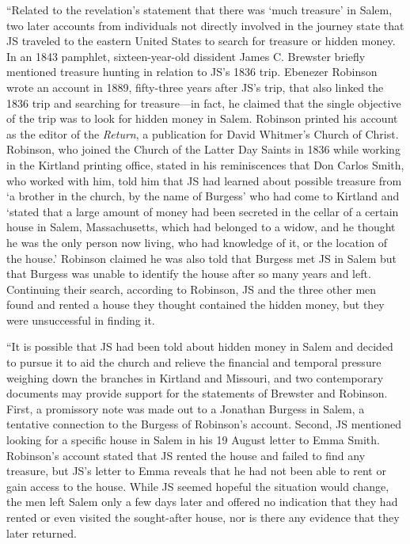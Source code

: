 			``Related to the revelation's statement that there was `much treasure' in Salem, two later accounts from individuals not directly involved in the journey state that JS traveled to the eastern United States to search for treasure or hidden money. In an 1843 pamphlet, sixteen-year-old dissident James C. Brewster briefly mentioned treasure hunting in relation to JS's 1836 trip. Ebenezer Robinson wrote an account in 1889, fifty-three years after JS's trip, that also linked the 1836 trip and searching for treasure---in fact, he claimed that the single objective of the trip was to look for hidden money in Salem. Robinson printed his account as the editor of the \textit{Return}, a publication for David Whitmer's Church of Christ. Robinson, who joined the Church of the Latter Day Saints in 1836 while working in the Kirtland printing office, stated in his reminiscences that Don Carlos Smith, who worked with him, told him that JS had learned about possible treasure from `a brother in the church, by the name of Burgess' who had come to Kirtland and `stated that a large amount of money had been secreted in the cellar of a certain house in Salem, Massachusetts, which had belonged to a widow, and he thought he was the only person now living, who had knowledge of it, or the location of the house.' Robinson claimed he was also told that Burgess met JS in Salem but that Burgess was unable to identify the house after so many years and left. Continuing their search, according to Robinson, JS and the three other men found and rented a house they thought contained the hidden money, but they were unsuccessful in finding it.

			``It is possible that JS had been told about hidden money in Salem and decided to pursue it to aid the church and relieve the financial and temporal pressure weighing down the branches in Kirtland and Missouri, and two contemporary documents may provide support for the statements of Brewster and Robinson. First, a promissory note was made out to a Jonathan Burgess in Salem, a tentative connection to the Burgess of Robinson's account. Second, JS mentioned looking for a specific house in Salem in his 19 August letter to Emma Smith. Robinson's account stated that JS rented the house and failed to find any treasure, but JS's letter to Emma reveals that he had not been able to rent or gain access to the house. While JS seemed hopeful the situation would change, the men left Salem only a few days later and offered no indication that they had rented or even visited the sought-after house, nor is there any evidence that they later returned.

